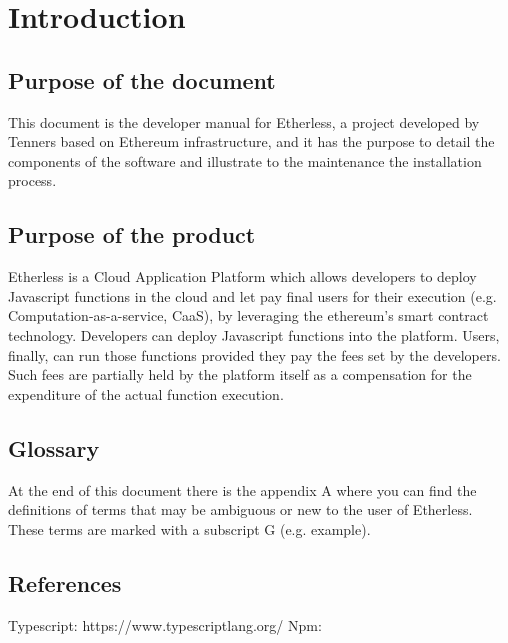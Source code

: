 \section{Introduction}

\subsection{Purpose of the document}
This document is the developer manual for Etherless, a project developed by Tenners based on Ethereum infrastructure, and it has the purpose to detail the components of the software and illustrate to the maintenance the installation process.

\subsection{Purpose of the product}
Etherless is a Cloud Application Platform which allows developers to deploy Javascript functions in the cloud and let pay final users for their execution (e.g. Computation-as-a-service, CaaS), by leveraging the ethereum's smart contract technology. Developers can deploy Javascript functions into the platform. Users, finally, can run those functions provided they pay the fees set by the developers. Such fees are partially held by the platform itself as a compensation for the expenditure of the actual function execution.

\subsection{Glossary}
At the end of this document there is the appendix A where you can find the definitions of terms that may be ambiguous or new to the user of Etherless. These terms are marked with a subscript G (e.g. example\glos).

\subsection{References}

Typescript: https://www.typescriptlang.org/
Npm: 
